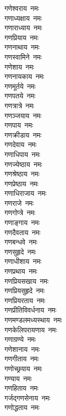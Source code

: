 \begin{multicols}{2}
\begin{flushleft}
गणेश्वराय~नमः\\
गणाध्यक्षाय~नमः\\
गणाराध्याय~नमः\\
गणप्रियाय~नमः\\
गणनाथाय~नमः\\
गणस्वामिने~नमः\\
गणेशाय~नमः\\
गणनायकाय~नमः\\
गणमूर्तये~नमः\\
गणपतये~नमः\hfill{}\\
गणत्रात्रे~नमः\\
गणञ्जयाय~नमः\\
गणपाय~नमः\\
गणक्रीडाय~नमः\\
गणदेवाय~नमः\\
गणाधिपाय~नमः\\
गणज्येष्ठाय~नमः\\
गणश्रेष्ठाय~नमः\\
गणप्रेष्ठाय~नमः\\
गणाधिराजाय~नमः\hfill{}\\
गणराजे~नमः\\
गणगोप्त्रे~नमः\\
गणाङ्गाय~नमः\\
गणदैवताय~नमः\\
गणबन्धवे~नमः\\
गणसुहृदे~नमः\\
गणाधीशाय~नमः\\
गणप्रथाय~नमः\\
गणप्रियसखाय~नमः\\
गणप्रियसुहृदे~नमः\hfill{}\\
गणप्रियरताय~नमः\\
गणप्रीतिविवर्धनाय~नमः\\
गणमण्डलमध्यस्थाय~नमः\\
गणकेलिपरायणाय~नमः\\
गणाग्रण्ये~नमः\\
गणेशानाय~नमः\\
गणगीताय~नमः\\
गणोच्छ्रयाय~नमः\\
गण्याय~नमः\\
गणहिताय~नमः\hfill{}\\
गर्जद्गणसेनाय~नमः\\
गणोद्धताय~नमः\\

\end{flushleft}
\end{multicols}
